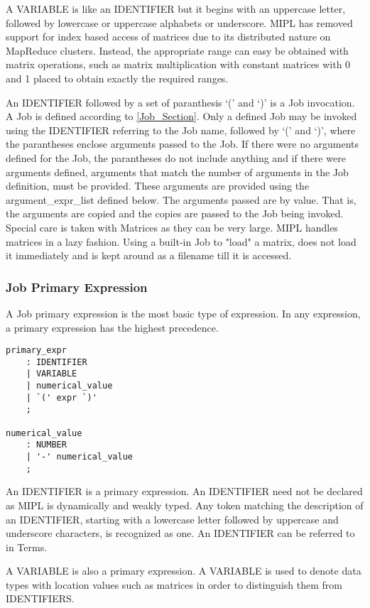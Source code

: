 \documentclass[prodmode,acmtecs]{acmsmall}
\begin{document}
A VARIABLE is like an IDENTIFIER but it begins with an uppercase letter,
followed by lowercase or uppercase alphabets or underscore. MIPL has 
removed support for index based access of matrices due to its distributed
nature on MapReduce clusters. Instead, the appropriate range can easy be 
obtained with matrix operations, such as matrix multiplication with constant
matrices with 0 and 1 placed to obtain exactly the required ranges.

An IDENTIFIER followed by a set of paranthesis `(' and `)' is a Job
invocation. A Job is defined according to \ref{Job_Section}. Only a defined
Job may be invoked using the IDENTIFIER referring to the Job name,
followed by `(' and `)', where the parantheses enclose arguments passed
to the Job. If there were no arguments defined for the Job, the
parantheses do not include anything and if there were arguments defined, 
arguments that match the number of arguments in the Job definition, must
be provided. These arguments are provided using the argument\_expr\_list 
defined below. The arguments passed are by value. That is, the arguments 
are copied and the copies are passed to the Job being invoked. Special
care is taken with Matrices as they can be very large. MIPL handles 
matrices in a lazy fashion. Using a built-in Job to "load" a matrix, 
does not load it immediately and is kept around as a filename till it is
accessed.
\medskip

\subsubsection{Job Primary Expression}

A Job primary expression is the most basic type of expression. In any
expression, a primary expression has the highest precedence.

\begin{lstlisting}
primary_expr
	: IDENTIFIER
	| VARIABLE
	| numerical_value
	| `(' expr `)'
	;

numerical_value
	: NUMBER
	| '-' numerical_value
	;
\end{lstlisting}

An IDENTIFIER is a primary expression. An IDENTIFIER need not be declared
as MIPL is dynamically and weakly typed. Any token matching the description
of an IDENTIFIER, starting with a lowercase letter followed by uppercase and
underscore characters, is recognized as one. An IDENTIFIER can be referred to
in Terms.

A VARIABLE is also a primary expression. A VARIABLE is used to denote 
data types with location values such as matrices in order to distinguish them 
from IDENTIFIERS.
\end{document}
